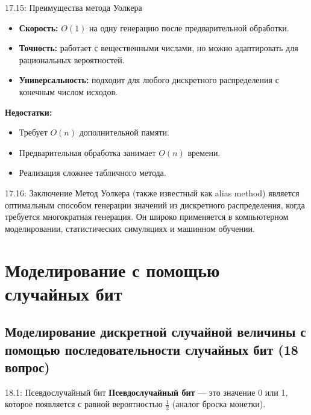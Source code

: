 \documentclass[a4paper,12pt]{article}
\begin{document}
	
	\begin{importantbox}{17.15: Преимущества метода Уолкера}
		\begin{itemize}
			\item \textbf{Скорость:} \(O(1)\) на одну генерацию после предварительной обработки.
			\item \textbf{Точность:} работает с вещественными числами, но можно адаптировать для рациональных вероятностей.
			\item \textbf{Универсальность:} подходит для любого дискретного распределения с конечным числом исходов.
		\end{itemize}
		
		\textbf{Недостатки:}
		\begin{itemize}
			\item Требует \(O(n)\) дополнительной памяти.
			\item Предварительная обработка занимает \(O(n)\) времени.
			\item Реализация сложнее табличного метода.
		\end{itemize}
	\end{importantbox}
	
	\begin{notebook}{17.16: Заключение}
		Метод Уолкера (также известный как alias method) является оптимальным способом генерации значений из дискретного распределения, когда требуется многократная генерация. Он широко применяется в компьютерном моделировании, статистических симуляциях и машинном обучении.
	\end{notebook}
	
	
	
	
	
	
	\newpage
	\section{Моделирование с помощью случайных бит}
	
	\subsection{Моделирование дискретной случайной величины с помощью последовательности случайных бит (18 вопрос)}
	
	\begin{definitionbox}{18.1: Псевдослучайный бит}
		\textbf{Псевдослучайный бит} — это значение 0 или 1, которое появляется с равной вероятностью \(\frac{1}{2}\) (аналог броска монетки).
	\end{definitionbox}
	
\end{document}
